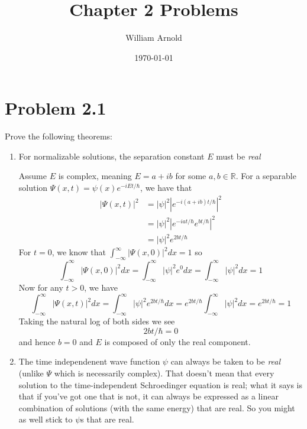\documentclass{article}
\title{Chapter 2 Problems}
\author{William Arnold}
\date\today
\newcommand{\intinf}{\int_{-\infty}^\infty}
\newenvironment{problem}{\begin{enumerate}[label=(\alph*)]}{\end{enumerate}}
\begin{document}
\maketitle 

\section*{Problem 2.1}
  Prove the following theorems:
  \begin{problem}
    \item For normalizable solutions, the separation constant $E$ must be \textit{real}

      Assume $E$ is complex, meaning $E = a + ib$ for some $a,b \in \mathbb{R}$. For a separable solution $\Psi(x, t) = \psi(x) e^{-iEt/\hbar}$, we have that
      \begin{align*}
        |\Psi(x,t)|^2 &= |\psi|^2 \left|e^{-i(a+ib)t/\hbar}\right|^2 \\
                      &= |\psi|^2 \left|e^{-iat/\hbar} e^{bt/\hbar}\right|^2 \\
                      &= |\psi|^2 e^{2bt/\hbar}
      \end{align*}
      For $t=0$, we know that $\intinf |\Psi(x,0)|^2 dx = 1$ so
      $$ \intinf |\Psi(x,0)|^2 dx = \intinf |\psi|^2 e^0 dx = \intinf |\psi|^2 dx = 1$$
      Now for any $t > 0$, we have
      $$ \intinf |\Psi(x,t)|^2 dx = \intinf |\psi|^2 e^{2bt/\hbar} dx = e^{2bt/\hbar}\intinf |\psi|^2 dx = e^{2bt/\hbar} = 1$$
      Taking the natural log of both sides we see
      $$ 2bt/\hbar = 0 $$
      and hence $b = 0$ and $E$ is composed of only the real component.

    \item The time independenent wave function $\psi$ can always be taken to be \textit{real} (unlike $\Psi$ which is necessarily complex). 
      That doesn't mean that every solution to the time-independent Schroedinger equation is real; what it says is that if you've got one that is not, it can always be expressed as a linear combination of solutions (with the same energy) that are real. So you might as well stick to $\psi$s that are real.
      

\end{problem}
\end{document}
